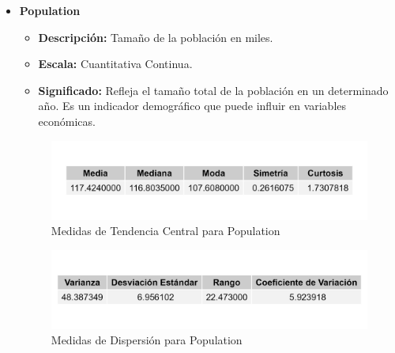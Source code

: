 \documentclass{article}
\begin{document}
\begin{itemize}
    \item \textbf{Population}
    \begin{itemize}
        \item \textbf{Descripción:} Tamaño de la población en miles.
        \item \textbf{Escala:} Cuantitativa Continua.
        \item \textbf{Significado:} Refleja el tamaño total de la población en un determinado año. Es un indicador demográfico que puede influir en variables económicas.
    \end{itemize}
    \begin{figure}[H]
        \centering
        \includegraphics[width=\textwidth]{MTC/Population_central.png}
        \caption{Medidas de Tendencia Central para Population}
    \end{figure}
    \begin{figure}[H]
        \centering
        \includegraphics[width=\textwidth]{MTC/Population_dispersion.png}
        \caption{Medidas de Dispersión para Population}
    \end{figure}
    

\end{itemize}
\end{document}
